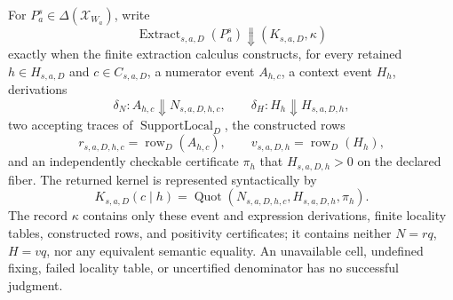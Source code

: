For \(P_a^s\in\Delta(\mathcal X_{W_a})\), write
\[
\operatorname{Extract}_{s,a,D}(P_a^s)\Downarrow(K_{s,a,D},\kappa)
\]
exactly when the finite extraction calculus constructs, for every retained \(h\in H_{s,a,D}\) and \(c\in C_{s,a,D}\), a numerator event \(A_{h,c}\), a context event \(H_h\), derivations
\[
\delta_N:A_{h,c}\Downarrow N_{s,a,D,h,c},
\qquad
\delta_H:H_h\Downarrow H_{s,a,D,h},
\]
two accepting traces of \(\operatorname{SupportLocal}_D\), the constructed rows
\[
r_{s,a,D,h,c}=\operatorname{row}_D(A_{h,c}),
\qquad
v_{s,a,D,h}=\operatorname{row}_D(H_h),
\]
and an independently checkable certificate \(\pi_h\) that \(H_{s,a,D,h}>0\) on the declared fiber.  The returned kernel is represented syntactically by
\[
K_{s,a,D}(c\mid h)=
\operatorname{Quot}(N_{s,a,D,h,c},H_{s,a,D,h},\pi_h).
\]
The record \(\kappa\) contains only these event and expression derivations, finite locality tables, constructed rows, and positivity certificates; it contains neither \(N=rq\), \(H=vq\), nor any equivalent semantic equality.  An unavailable cell, undefined fixing, failed locality table, or uncertified denominator has no successful judgment.
